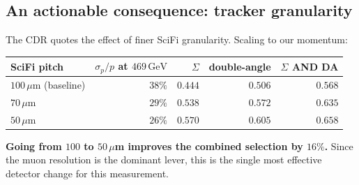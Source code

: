 \documentclass[11pt,a4paper]{article}
\newcommand{\GeV}{\,\mathrm{GeV}}
\begin{document}
\subsection{An actionable consequence: tracker granularity}
The CDR quotes the effect of finer SciFi granularity. Scaling to our momentum:
\begin{center}\small
\begin{tabular}{lrrrr}
\toprule
SciFi pitch & $\sigma_p/p$ at $469\GeV$ & $\Sigma$ & double-angle & $\Sigma$ AND DA \\
\midrule
$100\,\mu$m (baseline) & $38\%$ & $0.444$ & $0.506$ & $0.568$ \\
$70\,\mu$m & $29\%$ & $0.538$ & $0.572$ & $0.635$ \\
$50\,\mu$m & $26\%$ & $0.570$ & $0.605$ & $0.658$ \\
\bottomrule
\end{tabular}
\end{center}
\textbf{Going from $100$ to $50\,\mu$m improves the combined selection by
$16\%$.} Since the muon resolution is the dominant lever, this is the single
most effective detector change for this measurement.
\end{document}
